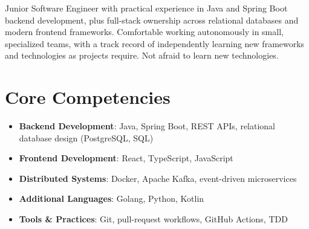 \documentclass[11pt,a4paper,sans]{moderncv}
\begin{document}
\makecvtitle


\vspace{6pt}
\small{Junior Software Engineer with practical experience in Java and Spring Boot backend development, plus full-stack ownership across relational databases and modern frontend frameworks. Comfortable working autonomously in small, specialized teams, with a track record of independently learning new frameworks and technologies as projects require. Not afraid to learn new technologies.}


\section{Core Competencies}
\vspace{1pt}
\begin{itemize}

\item \textbf{Backend Development}: Java, Spring Boot, REST APIs, relational database design (PostgreSQL, SQL)

\item \textbf{Frontend Development}: React, TypeScript, JavaScript

\item \textbf{Distributed Systems}: Docker, Apache Kafka, event-driven microservices

\item \textbf{Additional Languages}: Golang, Python, Kotlin

\item \textbf{Tools \& Practices}: Git, pull-request workflows, GitHub Actions, TDD

\end{itemize}

\end{document}
